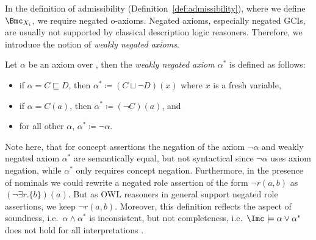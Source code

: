 In the definition of admissibility (Definition~\ref{def:admissibility}), where we define $\Bmc_{X_{i}}$,
we require negated o-axioms. Negated axioms, especially negated GCIs, are usually not supported by
classical description logic reasoners. Therefore, we introduce the notion of \emph{weakly negated
  axioms}.

\begin{definition}
  Let $\alpha$ be an axiom over \Nsig, then the \emph{weakly negated axiom $\alpha^{*}$} is defined
  as follows:
  \begin{itemize}
  \item if $\alpha = C \sqsubseteq D$, then $\alpha^{*} \coloneqq (C \sqcup \lnot D)(x)$ where $x$
    is a fresh variable,
  \item if $\alpha = C(a)$, then $\alpha^{*} \coloneqq (\lnot C)(a)$, and
  \item for all other $\alpha$, $\alpha^{*} \coloneqq \lnot \alpha$. \qedhere
  \end{itemize}
\end{definition}

Note here, that for concept assertions the negation of the axiom $\lnot\alpha$ and weakly negated
axiom $\alpha^{*}$ are semantically equal, but not syntactical since $\lnot\alpha$ uses axiom
negation, while $\alpha^{*}$ only requires concept negation. Furthermore, in the presence of
nominals we could rewrite a negated role assertion of the form $\lnot r(a,b)$ as
$(\lnot\exists r.\{b\})(a)$. But as OWL reasoners in general support negated role assertions, we
keep $\lnot r(a,b)$.  Moreover, this definition reflects the aspect of
%
%
soundness, i.e.\ $\alpha\land\alpha^{*}$ is inconsistent, but not completeness,
i.e.~$\I\models\alpha\lor\alpha^{*}$ does not hold for all interpretations \I.

